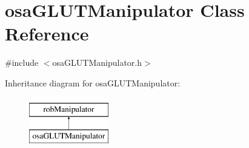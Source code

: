 \hypertarget{classosa_g_l_u_t_manipulator}{\section{osa\-G\-L\-U\-T\-Manipulator Class Reference}
\label{classosa_g_l_u_t_manipulator}
}


{\ttfamily \#include $<$osa\-G\-L\-U\-T\-Manipulator.\-h$>$}

Inheritance diagram for osa\-G\-L\-U\-T\-Manipulator\-:\begin{figure}[H]
\begin{center}
\leavevmode
\includegraphics[height=2.000000cm]{dd/dfc/classosa_g_l_u_t_manipulator}
\end{center}
\end{figure}
